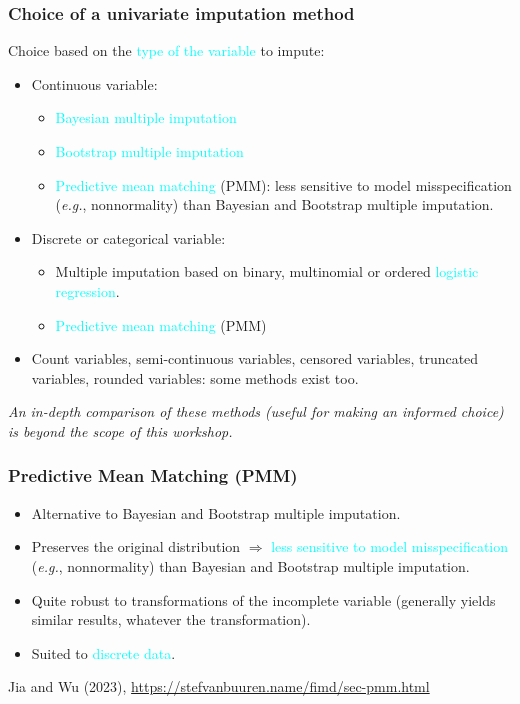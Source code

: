 \documentclass{beamer}
\begin{document}
\begin{frame}
\frametitle{Choice of a univariate imputation method}

Choice based on the \textcolor{cyan}{type of the variable} to impute:
\begin{itemize}
	\item Continuous variable:
		\begin{itemize}
			\item \textcolor{cyan}{Bayesian multiple imputation}
			\item \textcolor{cyan}{Bootstrap multiple imputation}
			\item \textcolor{cyan}{Predictive mean matching} (PMM): less sensitive to model misspecification (\textit{e.g.}, nonnormality) than Bayesian and Bootstrap multiple imputation.
	\end{itemize}
	\item Discrete or categorical variable:
		\begin{itemize}
			\item Multiple imputation based on binary, multinomial or ordered \textcolor{cyan}{logistic regression}.
			\item \textcolor{cyan}{Predictive mean matching} (PMM)
		\end{itemize}
	\item Count variables, semi-continuous variables, censored variables, truncated variables, rounded variables: some methods exist too.
\end{itemize}

\emph{An in-depth comparison of these methods (useful for making an informed choice) is beyond the scope of this workshop.}

\end{frame}


\begin{frame}
\frametitle{Predictive Mean Matching (PMM)}		

	\begin{itemize}
		\item Alternative to Bayesian and Bootstrap multiple imputation.
		\item Preserves the original distribution $\Rightarrow$ \textcolor{cyan}{less sensitive to model misspecification} (\textit{e.g.}, nonnormality) than Bayesian and Bootstrap multiple imputation.

		\item Quite robust to transformations of the incomplete variable (generally yields similar results, whatever the transformation).
		\item Suited to \textcolor{cyan}{discrete data}.
	
	\end{itemize}
	\vfill
{\footnotesize Jia and Wu (2023), \url{https://stefvanbuuren.name/fimd/sec-pmm.html}}
\end{frame}
\end{document}
